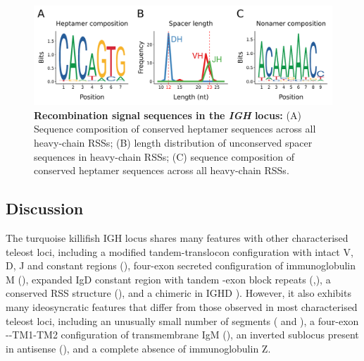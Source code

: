 	\begin{figure}
	\includegraphics[width=\textwidth]{_Figures/png/nfu-rss-seqlogo-all}
	\caption[Recombination signal sequences in the \Nfu \textit{IGH} locus]{\textbf{Recombination signal sequences in the \Nfu \textit{IGH} locus:} (A) Sequence composition of conserved heptamer sequences across all \Nfu heavy-chain RSSs; (B) length distribution of unconserved spacer sequences in \Nfu heavy-chain RSSs; (C) sequence composition of conserved heptamer sequences across all \Nfu heavy-chain RSSs.}
	\label{fig:nfu-rss-seqlogo-all}
	\end{figure} %
	
	



	
	\subsection{Discussion}
	
	The turquoise killifish IGH locus shares many features with other characterised teleost loci, including a modified tandem-translocon configuration with intact V, D, J and constant regions (), four-exon secreted configuration of immunoglobulin M (), expanded IgD constant region with tandem \cd{}-exon block repeats (,), a conserved RSS structure (), and a chimeric  in IGHD ). However, it also exhibits many ideosyncratic features that differ from those observed in most characterised teleost loci, including an unusually small number of \vh segments ( and ), a four-exon --TM1-TM2 configuration of transmembrane IgM (), an inverted sublocus present in antisense (), and a complete absence of immunoglobulin Z.
	

